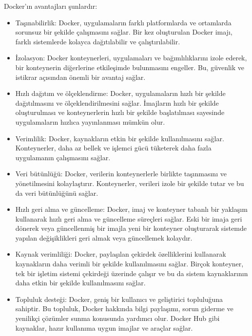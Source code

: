 Docker'ın avantajları şunlardır:
\begin{itemize}
\item Taşınabilirlik: Docker, uygulamaların farklı platformlarda ve ortamlarda sorunsuz bir şekilde çalışmasını sağlar. Bir kez oluşturulan Docker imajı, farklı sistemlerde kolayca dağıtılabilir ve çalıştırılabilir.

\item İzolasyon: Docker konteynerleri, uygulamaları ve bağımlılıklarını izole ederek, bir konteynerin diğerlerine etkileşimde bulunmasını engeller. Bu, güvenlik ve istikrar açısından önemli bir avantaj sağlar.

\item Hızlı dağıtım ve ölçeklendirme: Docker, uygulamaların hızlı bir şekilde dağıtılmasını ve ölçeklendirilmesini sağlar. İmajların hızlı bir şekilde oluşturulması ve konteynerlerin hızlı bir şekilde başlatılması sayesinde uygulamaların hızlıca yayınlanması mümkün olur.

\item Verimlilik: Docker, kaynakların etkin bir şekilde kullanılmasını sağlar. Konteynerler, daha az bellek ve işlemci gücü tüketerek daha fazla uygulamanın çalışmasını sağlar.

\item Veri bütünlüğü: Docker, verilerin konteynerlerle birlikte taşınmasını ve yönetilmesini kolaylaştırır. Konteynerler, verileri izole bir şekilde tutar ve bu da veri bütünlüğünü sağlar.

\item Hızlı geri alma ve güncelleme: Docker, imaj ve konteyner tabanlı bir yaklaşım kullanarak hızlı geri alma ve güncelleme süreçleri sağlar. Eski bir imaja geri dönerek veya güncellenmiş bir imajla yeni bir konteyner oluşturarak sistemde yapılan değişiklikleri geri almak veya güncellemek kolaydır.

\item Kaynak verimliliği: Docker, paylaşılan çekirdek özelliklerini kullanarak kaynakların daha verimli bir şekilde kullanılmasını sağlar. Birçok konteyner, tek bir işletim sistemi çekirdeği üzerinde çalışır ve bu da sistem kaynaklarının daha etkin bir şekilde kullanılmasını sağlar.

\item Topluluk desteği: Docker, geniş bir kullanıcı ve geliştirici topluluğuna sahiptir. Bu topluluk, Docker hakkında bilgi paylaşımı, sorun giderme ve yenilikçi çözümler sunma konusunda yardımcı olur. Docker Hub gibi kaynaklar, hazır kullanıma uygun imajlar ve araçlar sağlar.
\end{itemize}

